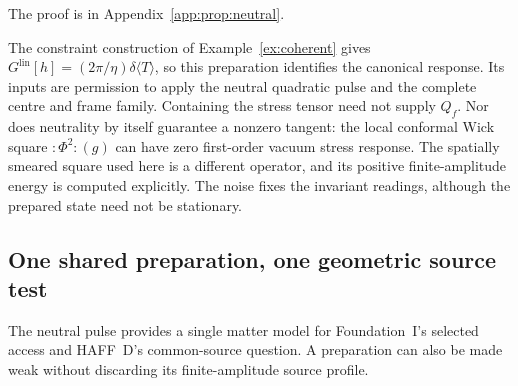 \documentclass[12pt]{article}
\theoremstyle{definition}
\theoremstyle{remark}
\newcommand{\Glin}{G^{\mathrm{lin}}}
\newcommand{\dT}{\delta\langle T\rangle}
\begin{document}
The proof is in Appendix~\ref{app:prop:neutral}.


The constraint construction of Example~\ref{ex:coherent} gives
\(\Glin[h]=(2\pi/\eta)\dT\), so this preparation identifies the canonical response.
Its inputs are permission to apply the neutral quadratic pulse and the complete
centre and frame family. Containing the stress tensor need not supply \(Q_f\).
Nor does neutrality by itself guarantee a nonzero tangent: the local conformal
Wick square \(:\Phi^2:(g)\) can have zero first-order vacuum stress response.
The spatially smeared square used here is a different operator, and its positive
finite-amplitude energy is computed explicitly. The noise fixes the invariant
readings, although the prepared state need not be stationary.

\subsection{One shared preparation, one geometric source test}
\label{subsec:common-source-test}

The neutral pulse provides a single matter model for Foundation~I's selected access and HAFF~D's common-source question. A preparation can also be made weak without discarding its finite-amplitude source profile.
\end{document}
